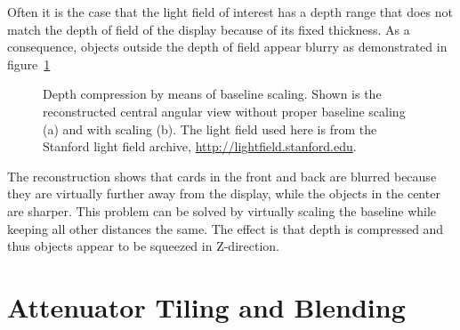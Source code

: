 Often it is the case that the light field of interest has a depth range that does not match the depth of field of the display because of its fixed thickness.
As a consequence, objects outside the depth of field appear blurry as demonstrated in figure~\ref{fig:reconstruction_baseline_unscaled}
\begin{figure}[tb]
	\begin{subfigure}{0.5\textwidth}
		\centering
		
		\caption{}
		\label{fig:reconstruction_baseline_unscaled}
	\end{subfigure}%
	\begin{subfigure}{0.5\textwidth}
		\centering
		
		\caption{}
		\label{fig:reconstruction_baseline_scaled_shifted}
	\end{subfigure}
	\caption[Baseline scaling]
			{Depth compression by means of baseline scaling.
			 Shown is the reconstructed central angular view without proper baseline scaling (a) and with scaling (b).
			 The light field used here is from the Stanford light field archive, \mbox{\url{http://lightfield.stanford.edu}}.}
	\label{fig:baseline_scaling}
\end{figure}
The reconstruction shows that cards in the front and back are blurred because they are virtually further away from the display, while the objects in the center are sharper.
This problem can be solved by virtually scaling the baseline while keeping all other distances the same.
The effect is that depth is compressed and thus objects appear to be squeezed in Z-direction.


\section{Attenuator Tiling and Blending}
\label{sec:tiling_and_blending}

